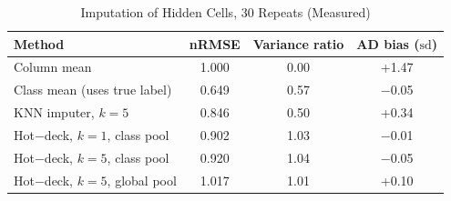 \begin{table}[t]
\centering
\caption{Imputation of Hidden Cells, 30 Repeats (Measured)}
\label{tab:impute}
\footnotesize
\begin{tabular}{@{}lccc@{}}
\toprule
Method & nRMSE & Variance ratio & AD bias ($\mathrm{sd}$) \\
\midrule
Column mean & 1.000 & 0.00 & +1.47 \\
Class mean (uses true label) & 0.649 & 0.57 & $-$0.05 \\
KNN imputer, $k=5$ & 0.846 & 0.50 & +0.34 \\
Hot$-$deck, $k=1$, class pool & 0.902 & 1.03 & $-$0.01 \\
Hot$-$deck, $k=5$, class pool & 0.920 & 1.04 & $-$0.05 \\
Hot$-$deck, $k=5$, global pool & 1.017 & 1.01 & +0.10 \\
\bottomrule
\end{tabular}
\end{table}
